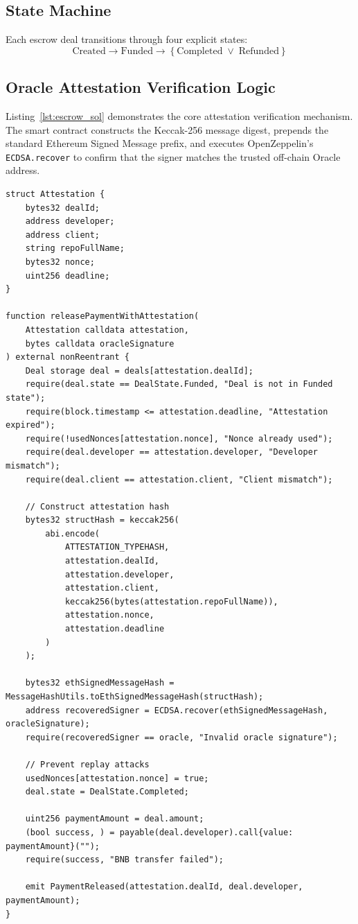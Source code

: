 \documentclass[11pt,a4paper]{article}
\begin{document}
\subsection{State Machine}
Each escrow deal transitions through four explicit states:
\begin{equation}
    \text{Created} \longrightarrow \text{Funded} \longrightarrow \left\{ \text{Completed} \; \lor \; \text{Refunded} \right\}
\end{equation}

\subsection{Oracle Attestation Verification Logic}
Listing~\ref{lst:escrow_sol} demonstrates the core attestation verification mechanism. The smart contract constructs the Keccak-256 message digest, prepends the standard Ethereum Signed Message prefix, and executes OpenZeppelin's \texttt{ECDSA.recover} to confirm that the signer matches the trusted off-chain Oracle address.

\begin{lstlisting}[language=Solidity, caption={Oracle Attestation Verification in GitLockEscrow.sol}, label={lst:escrow_sol}]
struct Attestation {
    bytes32 dealId;
    address developer;
    address client;
    string repoFullName;
    bytes32 nonce;
    uint256 deadline;
}

function releasePaymentWithAttestation(
    Attestation calldata attestation,
    bytes calldata oracleSignature
) external nonReentrant {
    Deal storage deal = deals[attestation.dealId];
    require(deal.state == DealState.Funded, "Deal is not in Funded state");
    require(block.timestamp <= attestation.deadline, "Attestation expired");
    require(!usedNonces[attestation.nonce], "Nonce already used");
    require(deal.developer == attestation.developer, "Developer mismatch");
    require(deal.client == attestation.client, "Client mismatch");

    // Construct attestation hash
    bytes32 structHash = keccak256(
        abi.encode(
            ATTESTATION_TYPEHASH,
            attestation.dealId,
            attestation.developer,
            attestation.client,
            keccak256(bytes(attestation.repoFullName)),
            attestation.nonce,
            attestation.deadline
        )
    );

    bytes32 ethSignedMessageHash = MessageHashUtils.toEthSignedMessageHash(structHash);
    address recoveredSigner = ECDSA.recover(ethSignedMessageHash, oracleSignature);
    require(recoveredSigner == oracle, "Invalid oracle signature");

    // Prevent replay attacks
    usedNonces[attestation.nonce] = true;
    deal.state = DealState.Completed;

    uint256 paymentAmount = deal.amount;
    (bool success, ) = payable(deal.developer).call{value: paymentAmount}("");
    require(success, "BNB transfer failed");

    emit PaymentReleased(attestation.dealId, deal.developer, paymentAmount);
}
\end{lstlisting}
\end{document}
